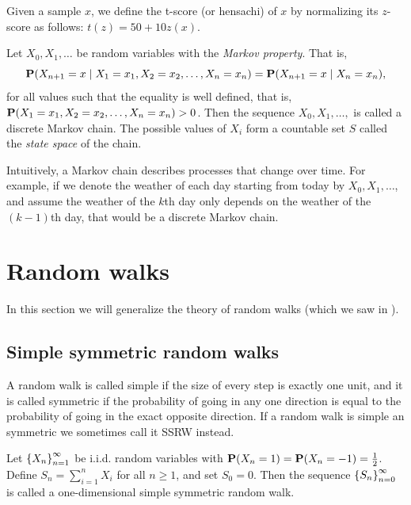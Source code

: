 \documentclass[11pt,a4paper]{article}
\begin{document}
\begin{definition}[T-score]
  Given a sample $x$,
  we define the t-score (or hensachi) of $x$ by
  normalizing its $z$-score as follows: $t(z) = 50 + 10 z(x)$.
\end{definition}

\begin{definition}
  Let $X_0,X_1,\dots$ be random variables with the \textit{Markov property}.
  That is,
  \[
    \mathbf{P}(X_{n+1} = x \mid X_1 = x_1, X_2 = x_2, \dots, X_n = x_n) =
    \mathbf{P}(X_{n+1} = x \mid X_n = x_n),
  \]
  for all values such that the equality is well defined,
  that is, $\mathbf{P}(X_1 = x_1, X_2 = x_2, \dots, X_n = x_n) > 0$.
  Then the sequence $X_0,X_1,\dots,$ is called a discrete Markov chain.
  The possible values of $X_i$ form a countable set $S$ called the
  \textit{state space} of the chain.
\end{definition}

\begin{remark}
  Intuitively, a Markov chain describes processes that change over time.
  For example, if we denote the weather of each day
  starting from today by $X_0,X_1,\dots$,
  and assume the weather of the $k$th day only depends on the weather
  of the $(k-1)$th day, that would be a discrete Markov chain.
\end{remark}

\newpage

\section{Random walks}
In this section we will generalize the theory of random walks
(which we saw in ).

\subsection{Simple symmetric random walks}
A random walk is called simple if the size of every step is exactly one unit,
and it is called symmetric if the probability of going in any one direction
is equal to the probability of going in the exact opposite direction.
If a random walk is simple an symmetric we sometimes call it SSRW instead.

\begin{definition}
  Let $\left\{X_n\right\}_{n=1}^{\infty}$ be i.i.d. random variables
  with $\mathbf{P}(X_n = 1) = \mathbf{P}(X_n = -1) = \frac{1}{2}$.
  Define $S_n = \sum_{i = 1}^{n} X_i$ for all $n \geq 1$,
  and set $S_0 = 0$.
  Then the sequence $\left\{S_n\right\}_{n=0}^{\infty}$ is called a one-dimensional
  simple symmetric random walk.
\end{definition}
\end{document}
